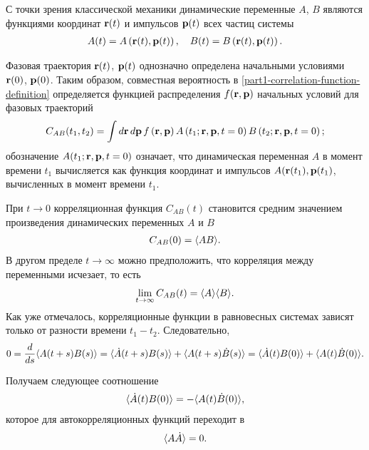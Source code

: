 С точки зрения классической механики динамические переменные $A$, $B$ являются функциями координат $\mathbf{r}(t)$ и импульсов $\mathbf{p}(t)$ всех частиц системы
\begin{gather}
    A(t) = A \left( \mathbf{r}(t), \mathbf{p}(t) \right), \quad B(t) = B \left( \mathbf{r}(t), \mathbf{p}(t) \right).
\end{gather}

Фазовая траектория $\mathbf{r}(t)$, $\mathbf{p}(t)$ однозначно определена начальными условиями $\mathbf{r}(0)$, $\mathbf{p}(0)$. Таким образом, совместная вероятность в \eqref{part1-correlation-function-definition} определяется функцией распределения $f(\mathbf{r}, \mathbf{p})$ начальных условий для фазовых траекторий
\begin{gather}
    C_{AB}(t_1, t_2) = \int d\mathbf{r} \, d\mathbf{p} \, f \left( \mathbf{r}, \mathbf{p} \right) A\left( t_1; \mathbf{r}, \mathbf{p}, t = 0 \right) B \left( t_2; \mathbf{r}, \mathbf{p}, t = 0 \right);
\end{gather}
%
обозначение $A(t_1; \mathbf{r}, \mathbf{p}, t = 0)$ означает, что динамическая переменная $A$ в момент времени $t_1$ вычисляется как функция координат и импульсов $A(\mathbf{r}(t_1), \mathbf{p}(t_1)$, вычисленных в момент времени $t_1$. \par
    При $t \rightarrow 0$ корреляционная функция $C_{AB}(t)$ становится средним значением произведения динамических переменных $A$ и $B$
\begin{gather}
    C_{AB}(0) = \langle AB \rangle.
\end{gather}
%
В другом пределе $t \rightarrow \infty$ можно предположить, что корреляция между переменными исчезает, то есть
\begin{gather}
    \lim_{t \rightarrow \infty} C_{AB}(t) = \langle A \rangle \langle B \rangle.
\end{gather}
    Как уже отмечалось, корреляционные функции в равновесных системах зависят только от разности времени $t_1 - t_2$. Следовательно,
\begin{gather}
    0 = \frac{d}{ds} \langle  A(t+s) B(s)  \rangle = \langle  \dot{A}(t+s) B(s)  \rangle + \langle  A(t+s) \dot{B}(s)  \rangle = \langle  \dot{A}(t) B(0)  \rangle + \langle  A(t) \dot{B}(0)  \rangle.
\end{gather}

Получаем следующее соотношение 
\begin{gather}
    \langle \dot{A}(t)B(0) \rangle = -\langle A(t)\dot{B}(0) \rangle, 
\end{gather}
которое для автокорреляционных функций переходит в 
\begin{gather}
    \langle A \dot{A} \rangle = 0.
\end{gather}

